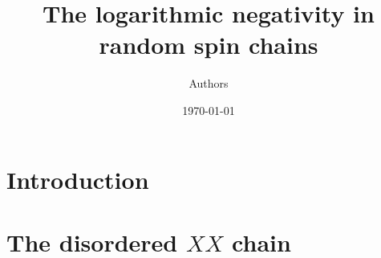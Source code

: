 \documentclass[twocolumn,superscriptaddress,prb,10pt]{revtex4-1}
\begin{document}
\title{The logarithmic negativity in random spin chains} 


\author{Authors}

\date{\today}




\begin{abstract} 


\end{abstract}


\maketitle


\section{Introduction}



\section{The disordered $XX$ chain}
\label{dis-XX}
\end{document}
